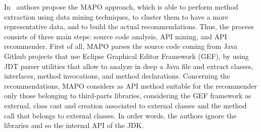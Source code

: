 In~\cite{zhong_mapo:_2009} authors propose the MAPO approach, which is able to 
perform method extraction using data mining techniques, to cluster them to have 
a more representative data, and to build the actual recommendations. Thus, the 
process consists of three main steps: source code analysis, API mining, and API 
recommender. First of all, MAPO parses the source code coming from Java Github 
projects that use Eclipse Graphical Editor Framework (GEF), by using JDT parser 
utilities that allow to analyze in deep a Java file and extract classes, 
interfaces, method invocations, and method declarations. Concerning the 
recommendations, MAPO considers as API method suitable for the recommender only 
those belonging to third-parts libraries, considering the GEF framework as 
external, class cast and creation associated to external classes and the method 
call that belongs to external classes. In order words, the authors ignore the 
libraries and so the internal API of the JDK. 


